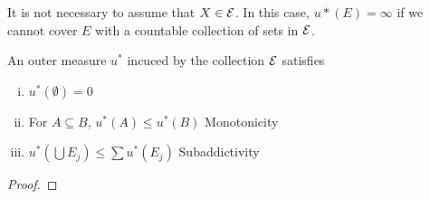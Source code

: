 \begin{remark}
  It is not necessary to assume that $X \in \mathcal E$.
  In this case, $u*(E) = \infty$ if we cannot cover $E$ with a countable collection of sets in $\mathcal E$.
\end{remark}

\begin{lemma}
  An outer measure $u^*$ incuced by the collection $\mathcal E$ satisfies
  \begin{enumerate}[(i)]
    \item $u^*(\emptyset) = 0$
    \item For $A \subseteq B$, $u^*(A) \le u^*(B)$ Monotonicity
    \item $u^*(\bigcup E_j) \le \sum u^*(E_j)$ Subaddictivity
  \end{enumerate}
\end{lemma}

\begin{proof}
  
\end{proof}